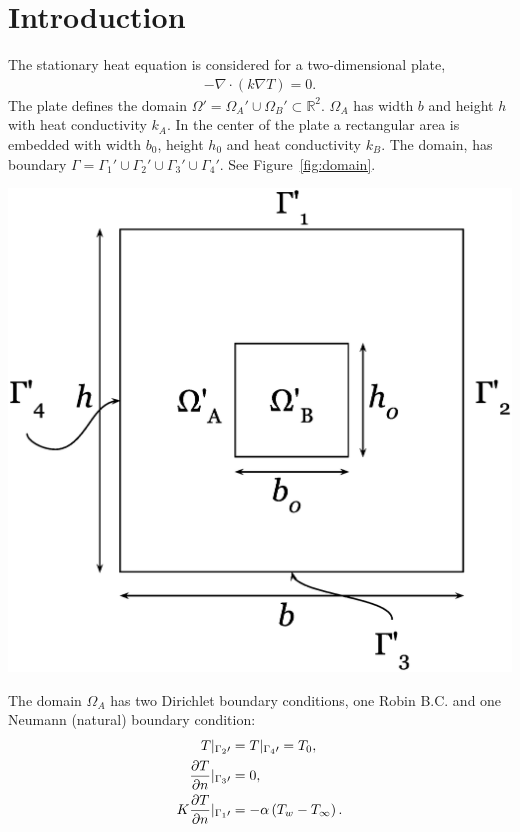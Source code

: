 \section{Introduction}
The stationary heat equation is considered for a two-dimensional plate,
\begin{gather}
    -\nabla\cdot\left(k\nabla T\right)=0.
\end{gather}\label{eq:heat}The plate defines the domain $\Omega\prime= \Omega_A\prime\cup\Omega_B\prime \subset \mathbb{R}^2$. $\Omega_A$ has width $b$ and height $h$ with heat conductivity $k_A$. In the center of the plate a rectangular area is embedded with width $b_0$, height $h_0$ and heat conductivity $k_B$. The domain, has boundary $\Gamma=\Gamma_1\prime\cup\Gamma_2\prime\cup\Gamma_3\prime\cup\Gamma_4\prime$. See Figure~\ref{fig:domain}. 
\begin{Figure}
 \centering
 \includegraphics[width=0.7\linewidth]{domain.eps}
 \label{fig:domain}
\end{Figure}The domain $\Omega_A$ has two Dirichlet boundary conditions, one Robin B.C. and one Neumann (natural) boundary condition: 
\begin{gather*}
\begin{align*}
    T\arrowvert_{\Gamma_2\prime} &= T\arrowvert_{\Gamma_4\prime} = T_0,\\
    \frac{\partial T}{\partial n}\arrowvert_{\Gamma_3\prime} &= 0,\\
    K\frac{\partial T}{\partial n}\arrowvert_{\Gamma_1\prime} &= -\alpha \left(T_w - T_{\infty}\right).
\end{align*}
\end{gather*}